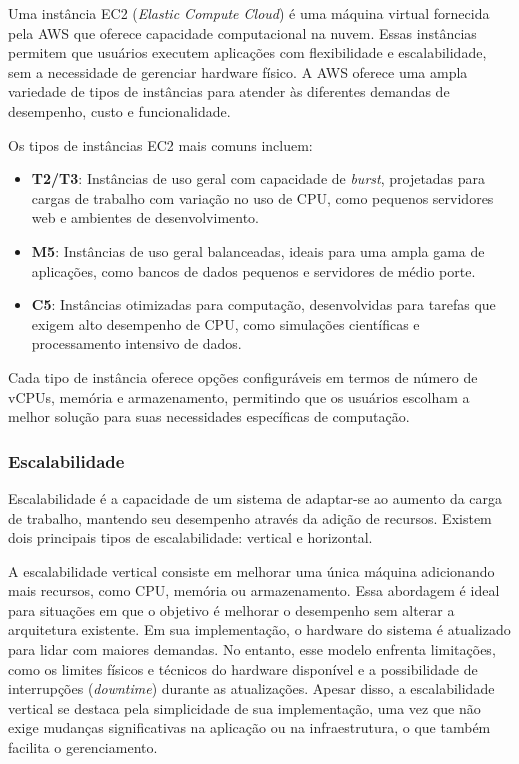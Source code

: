 Uma instância EC2 (\emph{Elastic Compute Cloud}) é uma máquina virtual fornecida pela AWS que oferece capacidade computacional na nuvem. Essas instâncias permitem que usuários executem aplicações com flexibilidade e escalabilidade, sem a necessidade de gerenciar hardware físico. A AWS oferece uma ampla variedade de tipos de instâncias para atender às diferentes demandas de desempenho, custo e funcionalidade.

Os tipos de instâncias EC2 mais comuns incluem:

\begin{itemize}
    \item \textbf{T2/T3}: Instâncias de uso geral com capacidade de \emph{burst}, projetadas para cargas de trabalho com variação no uso de CPU, como pequenos servidores web e ambientes de desenvolvimento.
    \item \textbf{M5}: Instâncias de uso geral balanceadas, ideais para uma ampla gama de aplicações, como bancos de dados pequenos e servidores de médio porte.
    \item \textbf{C5}: Instâncias otimizadas para computação, desenvolvidas para tarefas que exigem alto desempenho de CPU, como simulações científicas e processamento intensivo de dados.
\end{itemize}

Cada tipo de instância oferece opções configuráveis em termos de número de vCPUs, memória e armazenamento, permitindo que os usuários escolham a melhor solução para suas necessidades específicas de computação.

\subsubsection{Escalabilidade}



Escalabilidade é a capacidade de um sistema de adaptar-se ao aumento da carga de trabalho, mantendo seu desempenho através da adição de recursos. Existem dois principais tipos de escalabilidade: vertical e horizontal.

A escalabilidade vertical consiste em melhorar uma única máquina adicionando mais recursos, como CPU, memória ou armazenamento. Essa abordagem é ideal para situações em que o objetivo é melhorar o desempenho sem alterar a arquitetura existente. Em sua implementação, o hardware do sistema é atualizado para lidar com maiores demandas. No entanto, esse modelo enfrenta limitações, como os limites físicos e técnicos do hardware disponível e a possibilidade de interrupções (\emph{downtime}) durante as atualizações. Apesar disso, a escalabilidade vertical se destaca pela simplicidade de sua implementação, uma vez que não exige mudanças significativas na aplicação ou na infraestrutura, o que também facilita o gerenciamento.

